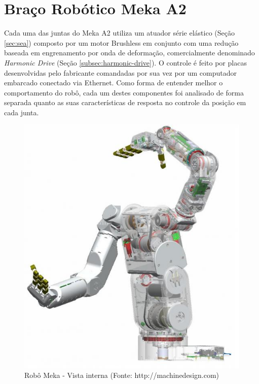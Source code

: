 


\section{Braço Robótico Meka A2}

Cada uma das juntas do Meka A2 utiliza um atuador série elástico (Seção \ref{sec:sea}) composto por um motor Brushless em conjunto com uma redução baseada em engrenamento por onda de deformação, comercialmente denominado \textit{Harmonic Drive} (Seção \ref{subsec:harmonic-drive}). O controle é feito por placas desenvolvidas pelo fabricante comandadas por sua vez por um computador embarcado conectado via Ethernet. Como forma de entender melhor o comportamento do robô, cada um destes componentes foi analisado de forma separada quanto as suas características de resposta no controle da posição em cada junta.

\begin{figure}[H]
    \centering
    \includegraphics[width = 0.6\linewidth]{tex/figs/meka-inside.png}
    \caption{Robô Meka - Vista interna (Fonte: http://machinedesign.com)}
    \label{fig:meka-inside}
\end{figure}

